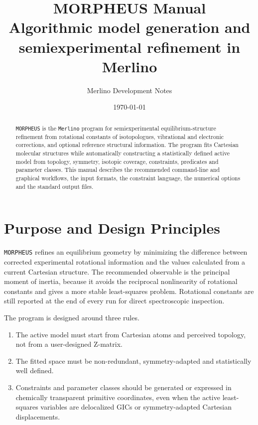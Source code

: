 \documentclass[11pt]{article}
\title{\textbf{MORPHEUS Manual}\\
\large Algorithmic model generation and semiexperimental refinement in Merlino}
\author{Merlino Development Notes}
\date{\today}
\newcommand{\program}{\texttt{MORPHEUS}}
\newcommand{\merlino}{\texttt{Merlino}}
\begin{document}
\maketitle

\begin{abstract}
\program{} is the \merlino{} program for semiexperimental equilibrium-structure
refinement from rotational constants of isotopologues, vibrational and
electronic corrections, and optional reference structural information.  The
program fits Cartesian molecular structures while automatically constructing a
statistically defined active model from topology, symmetry, isotopic coverage,
constraints, predicates and parameter classes.  This manual describes the
recommended command-line and graphical workflows, the input formats, the
constraint language, the numerical options and the standard output files.
\end{abstract}

\tableofcontents
\newpage

\section{Purpose and Design Principles}

\program{} refines an equilibrium geometry by minimizing the difference between
corrected experimental rotational information and the values calculated from a
current Cartesian structure.  The recommended observable is the principal
moment of inertia, because it avoids the reciprocal nonlinearity of rotational
constants and gives a more stable least-squares problem.  Rotational constants
are still reported at the end of every run for direct spectroscopic inspection.

The program is designed around three rules.

\begin{enumerate}
  \item The active model must start from Cartesian atoms and perceived topology,
        not from a user-designed Z-matrix.
  \item The fitted space must be non-redundant, symmetry-adapted and
        statistically well defined.
  \item Constraints and parameter classes should be generated or expressed in
        chemically transparent primitive coordinates, even when the active
        least-squares variables are delocalized GICs or symmetry-adapted
        Cartesian displacements.
\end{enumerate}
\end{document}
